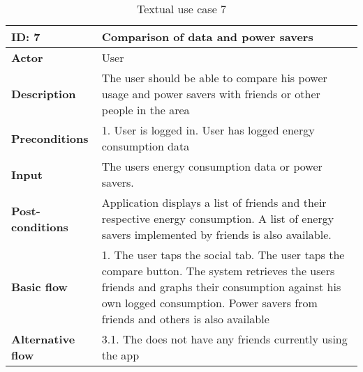 \begin{table}[H]
\begin{tabular}{|l|p{11.7cm}|}
\hline
\textbf{ID: }7&\textbf{Comparison of data and power savers}
\\\hline
\textbf{Actor} &User
\\\hline
\textbf{Description}&
The user should be able to compare his power usage and power savers with friends or other people in the area\\\hline
\textbf{Preconditions}&
1. User is logged in\newline
2. User has logged energy consumption data\\\hline
\textbf{Input}&
The users energy consumption data or power savers.\\\hline
\textbf{Post-conditions}& 
Application displays a list of friends and their respective energy consumption. A list of energy savers implemented by friends is also available. \\\hline
\textbf{Basic flow}&
1. The user taps the social tab\newline
2. The user taps the compare button\newline
3. The system retrieves the users friends and graphs their consumption against his own logged consumption\newline
4. Power savers from friends and others is also available
\\\hline
\textbf{Alternative flow}&
3.1. The does not have any friends currently using the app
\\\hline
\end{tabular}
\caption{Textual use case 7}
\end{table}
